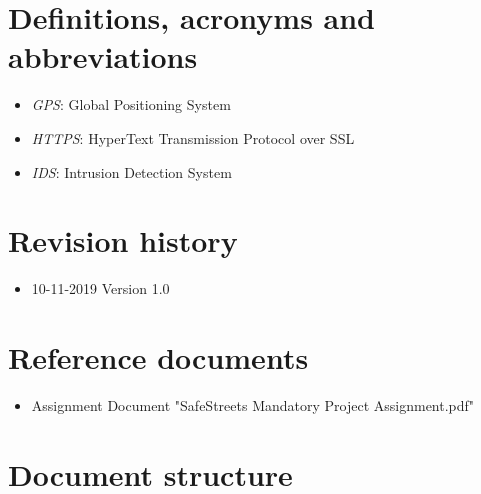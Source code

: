 \documentclass[a4paper]{report}
\begin{document}
\section{Definitions, acronyms and abbreviations}
\begin{itemize}
\item \textit{GPS}: Global Positioning System
\item \textit{HTTPS}: HyperText Transmission Protocol over SSL
\item \textit{IDS}: Intrusion Detection System
\end{itemize}
\section{Revision history}
\begin{itemize}
\item 10-11-2019 Version 1.0
\end{itemize}
\section{Reference documents}
\begin{itemize}
\item Assignment Document "SafeStreets Mandatory Project Assignment.pdf"
\end{itemize}
\section{Document structure}
\end{document}
